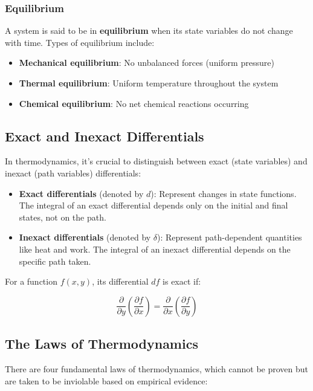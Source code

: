 \documentclass{article}
\theoremstyle{definition}
\begin{document}
\subsubsection{Equilibrium}
A system is said to be in \textbf{equilibrium} when its state variables do not change with time. Types of equilibrium include:

\begin{itemize}
    \item \textbf{Mechanical equilibrium}: No unbalanced forces (uniform pressure)
    \item \textbf{Thermal equilibrium}: Uniform temperature throughout the system
    \item \textbf{Chemical equilibrium}: No net chemical reactions occurring
\end{itemize}

\subsection{Exact and Inexact Differentials}

In thermodynamics, it's crucial to distinguish between exact (state variables) and inexact (path variables) differentials:

\begin{itemize}
    \item \textbf{Exact differentials} (denoted by $d$): Represent changes in state functions. The integral of an exact differential depends only on the initial and final states, not on the path.
    \item \textbf{Inexact differentials} (denoted by $\delta$): Represent path-dependent quantities like heat and work. The integral of an inexact differential depends on the specific path taken.
\end{itemize}

For a function $f(x,y)$, its differential $df$ is exact if:

\[
\frac{\partial}{\partial y}\left(\frac{\partial f}{\partial x}\right) = \frac{\partial}{\partial x}\left(\frac{\partial f}{\partial y}\right)
\]

\subsection{The Laws of Thermodynamics}

There are four fundamental laws of thermodynamics, which cannot be proven but are taken to be inviolable based on empirical evidence:
\end{document}
